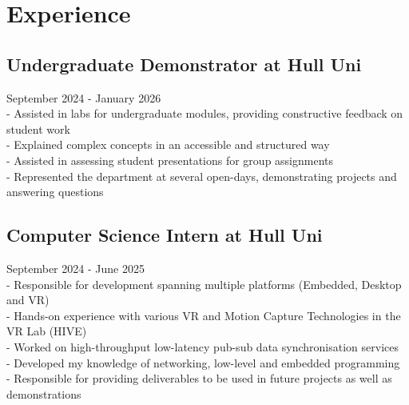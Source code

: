 \section{Experience}

\subsection{Undergraduate Demonstrator at Hull Uni} September 2024 - January 2026 \\
-\: Assisted in labs for undergraduate modules, providing constructive feedback on student work \\
-\: Explained complex concepts in an accessible and structured way \\
-\: Assisted in assessing student presentations for group assignments \\
-\: Represented the department at several open-days, demonstrating projects and answering questions \\


\subsection{Computer Science Intern at Hull Uni} September 2024 - June 2025 \\
-\: Responsible for development spanning multiple platforms (Embedded, Desktop and VR) \\
-\: Hands-on experience with various VR and Motion Capture Technologies in the VR Lab (HIVE) \\
-\: Worked on high-throughput low-latency pub-sub data synchronisation services \\
-\: Developed my knowledge of networking, low-level and embedded programming \\
-\: Responsible for providing deliverables to be used in future projects as well as demonstrations \\


